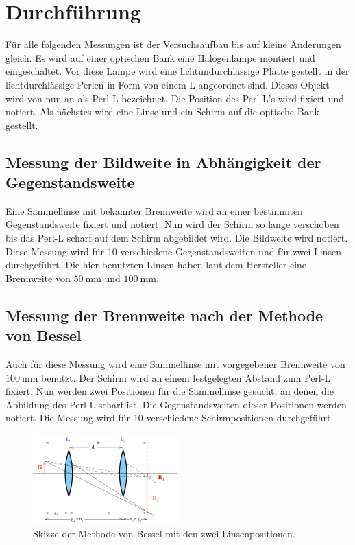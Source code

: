 \section{Durchführung}
\label{sec:Durchführung}

Für alle folgenden Messungen ist der Versuchsaufbau bis auf kleine Änderungen gleich.
Es wird auf einer optischen Bank eine Halogenlampe montiert und eingeschaltet.
Vor diese Lampe wird eine lichtundurchlässige Platte gestellt in der lichtdurchlässige Perlen in Form von einem L angeordnet sind.
Dieses Objekt wird von nun an als Perl-L bezeichnet.
Die Position des Perl-L's wird fixiert und notiert.
Als nächstes wird eine Linse und ein Schirm auf die optische Bank gestellt.

\subsection{Messung der Bildweite in Abhängigkeit der Gegenstandsweite}
\label{ssec:Durchführung_brennweite}

Eine Sammellinse mit bekannter Brennweite wird an einer bestimmten Gegenstandsweite fixiert und notiert.
Nun wird der Schirm so lange verschoben bis das Perl-L scharf auf dem Schirm abgebildet wird.
Die Bildweite wird notiert.
Diese Messung wird für 10 verschiedene Gegenstandsweiten und für zwei Linsen durchgeführt.
Die hier benutzten Linsen haben laut dem Hersteller eine Brennweite von $\SI{50}{\milli\metre}$ und $\SI{100}{\milli\metre}$.

\subsection{Messung der Brennweite nach der Methode von Bessel}
\label{ssec:Durchführung_bessel}

Auch für diese Messung wird eine Sammellinse mit vorgegebener Brennweite von $\SI{100}{\milli\metre}$ benutzt.
Der Schirm wird an einem festgelegten Abstand zum Perl-L fixiert.
Nun werden zwei Positionen für die Sammellinse gesucht, an denen die Abbildung des Perl-L scharf ist.
Die Gegenstandsweiten dieser Positionen werden notiert.
Die Messung wird für 10 verschiedene Schirmpositionen durchgeführt.

\begin{figure}
    \centering
    \includegraphics[width=0.5\textwidth]{images/skizze_bessel.png}
    \caption{Skizze der Methode von Bessel mit den zwei Linsenpositionen.\cite{V408}}
    \label{fig:skizze_bessel}
\end{figure}

